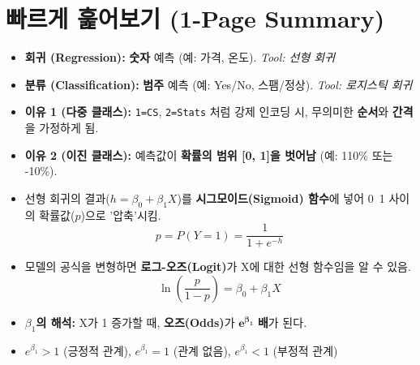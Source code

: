 \documentclass[11pt,a4paper]{book}
\theoremstyle{definition}
\begin{document}
\section*{빠르게 훑어보기 (1-Page Summary)}

\begin{tcolorbox}[colback=white, colframe=black!70, title={분류(Classification)와 로지스틱 회귀 핵심 요약}]
    
    \begin{tcolorbox}[colback=blue!5, colframe=blue!60, title={1. 문제 정의: 회귀 vs. 분류}]
        \begin{itemize}
            \item \textbf{회귀 (Regression):} \textbf{숫자} 예측 (예: 가격, 온도). \textit{Tool: 선형 회귀}
            \item \textbf{분류 (Classification):} \textbf{범주} 예측 (예: Yes/No, 스팸/정상). \textit{Tool: 로지스틱 회귀}
        \end{itemize}
    \end{tcolorbox}
    
    \begin{tcolorbox}[colback=red!5, colframe=red!60, title={2. 왜 선형 회귀는 분류에 실패하는가?}]
        \begin{itemize}
            \item \textbf{이유 1 (다중 클래스):} \texttt{1=CS}, \texttt{2=Stats} 처럼 강제 인코딩 시, 무의미한 \textbf{순서}와 \textbf{간격}을 가정하게 됨.
            \item \textbf{이유 2 (이진 클래스):} 예측값이 \textbf{확률의 범위 [0, 1]을 벗어남} (예: 110\% 또는 -10\%).
        \end{itemize}
    \end{tcolorbox}
    
    \begin{tcolorbox}[colback=green!5, colframe=green!70, title={3. 해결책: 로지스틱 회귀와 시그모이드}]
        \begin{itemize}
            \item 선형 회귀의 결과($h = \beta_0 + \beta_1 X$)를 \textbf{시그모이드(Sigmoid) 함수}에 넣어 0~1 사이의 확률값($p$)으로 '압축'시킴.
            $$ p = P(Y=1) = \frac{1}{1 + e^{-h}} $$
        \end{itemize}
    \end{tcolorbox}
    
    \begin{tcolorbox}[colback=orange!5, colframe=orange!70, title={4. 핵심 해석: 로그-오즈 (Log-Odds)}]
        \begin{itemize}
            \item 모델의 공식을 변형하면 \textbf{로그-오즈(Logit)}가 X에 대한 선형 함수임을 알 수 있음.
            $$ \ln\left( \frac{p}{1-p} \right) = \beta_0 + \beta_1 X $$
            \item \textbf{$\beta_1$의 해석:} X가 1 증가할 때, \textbf{오즈(Odds)}가 $\mathbf{e^{\beta_1}}$ \textbf{배}가 된다.
            \item $e^{\beta_1} > 1$ (긍정적 관계), $e^{\beta_1} = 1$ (관계 없음), $e^{\beta_1} < 1$ (부정적 관계)
        \end{itemize}
    \end{tcolorbox}
    

\end{tcolorbox}
\end{document}
